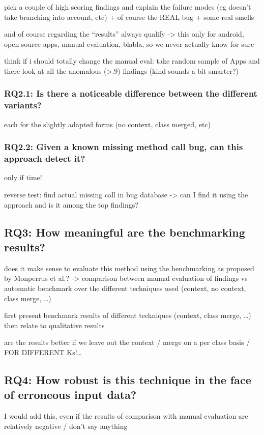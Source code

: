 pick a couple of high scoring findings and explain the failure modes (eg doesn't take branching into account, etc)
+ of course the REAL bug + some real smells

and of course regarding the ``results'' always qualify -> this only for android, open source apps, manual evaluation, blabla, so we never actually know for sure

think if i should totally change the manual eval: take random sample of Apps and there look at all the anomalous (>.9) findings (kind sounds a bit smarter?)

\subsubsection{RQ2.1: Is there a noticeable difference between the different variants?}
each for the slightly adapted forms (no context, class merged, etc)

\subsubsection{RQ2.2: Given a known missing method call bug, can this approach detect it?}
only if time!

reverse test: find actual missing call in bug database -> can I find it using the approach and is it among the top findings?

\subsection{RQ3: How meaningful are the benchmarking results?}
does it make sense to evaluate this method using the benchmarking as proposed by Monperrus et al.?
-> comparison between manual evaluation of findings vs automatic benchmark over the different techniques used (context, no context, class merge, \ldots)

first present benchmark results of different techniques (context, class merge, \ldots) then relate to qualitative results

are the results better if we leave out the context / merge on a per class basis / FOR DIFFERENT Ks!\ldots

\subsection{RQ4: How robust is this technique in the face of erroneous input data?}
I would add this, even if the results of comparison with manual evaluation are relatively negative / don't say anything

